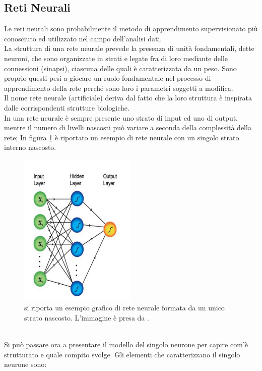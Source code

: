 \subsection{Reti Neurali}
\label{reti neurali}
Le reti neurali sono probabilmente il metodo di apprendimento supervisionato più conosciuto ed utilizzato nel campo dell'analisi dati. \\
La struttura di una rete neurale prevede la presenza di unità fondamentali, dette neuroni, che sono organizzate in strati e legate fra di loro mediante delle connessioni (sinapsi), ciascuna delle quali è caratterizzata da un peso. Sono proprio questi pesi a giocare un ruolo fondamentale nel processo di apprendimento della rete perché sono loro i parametri soggetti a modifica.\\
Il nome rete neurale (artificiale) deriva dal fatto che la loro struttura è inspirata dalle corrispondenti strutture biologiche. \\
In una rete neurale è sempre presente uno strato di input ed uno di output, mentre il numero di livelli nascosti può variare a seconda della complessità della rete; In figura \ref{fig:schemaNN} è riportato un esempio di rete neurale con un singolo strato interno nascosto.
\begin{figure}[h!]
	\centering
	\includegraphics[width=0.50\textwidth]{figs/schemaNN.png}
	\caption{si riporta un esempio grafico di rete neurale formata da un unico strato nascosto. L'immagine è presa da \cite{Metodi_multivariati}.}
	\label{fig:schemaNN}
\end{figure}
\\
Si può passare ora a presentare il modello del singolo neurone per capire com'è strutturato e quale compito svolge.
Gli elementi che caratterizzano il singolo neurone sono:
